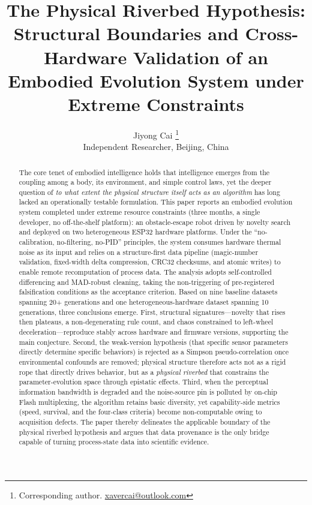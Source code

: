 \documentclass[11pt]{article}
\title{\bfseries The Physical Riverbed Hypothesis:\\ Structural Boundaries and Cross-Hardware Validation of an Embodied Evolution System under Extreme Constraints}
\author{Jiyong Cai \thanks{Corresponding author. \href{mailto:xavercai@outlook.com}{xavercai@outlook.com}} \\
  \small Independent Researcher, Beijing, China}
\date{}
\begin{document}
\maketitle

\begin{abstract}
\noindent
The core tenet of embodied intelligence holds that intelligence emerges from the coupling among a body, its environment, and simple control laws, yet the deeper question of \emph{to what extent the physical structure itself acts as an algorithm} has long lacked an operationally testable formulation. This paper reports an embodied evolution system completed under extreme resource constraints (three months, a single developer, no off-the-shelf platform): an obstacle-escape robot driven by novelty search and deployed on two heterogeneous ESP32 hardware platforms. Under the ``no-calibration, no-filtering, no-PID'' principles, the system consumes hardware thermal noise as its input and relies on a structure-first data pipeline (magic-number validation, fixed-width delta compression, CRC32 checksums, and atomic writes) to enable remote recomputation of process data. The analysis adopts self-controlled differencing and MAD-robust cleaning, taking the non-triggering of pre-registered falsification conditions as the acceptance criterion. Based on nine baseline datasets spanning 20+ generations and one heterogeneous-hardware dataset spanning 10 generations, three conclusions emerge. First, structural signatures---novelty that rises then plateaus, a non-degenerating rule count, and chaos constrained to left-wheel deceleration---reproduce stably across hardware and firmware versions, supporting the main conjecture. Second, the weak-version hypothesis (that specific sensor parameters directly determine specific behaviors) is rejected as a Simpson pseudo-correlation once environmental confounds are removed; physical structure therefore acts not as a rigid rope that directly drives behavior, but as a \emph{physical riverbed} that constrains the parameter-evolution space through epistatic effects. Third, when the perceptual information bandwidth is degraded and the noise-source pin is polluted by on-chip Flash multiplexing, the algorithm retains basic diversity, yet capability-side metrics (speed, survival, and the four-class criteria) become non-computable owing to acquisition defects. The paper thereby delineates the applicable boundary of the physical riverbed hypothesis and argues that data provenance is the only bridge capable of turning process-state data into scientific evidence.
\end{abstract}
\end{document}
